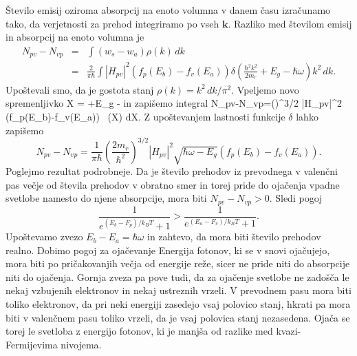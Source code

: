 Število emisij oziroma absorpcij na enoto volumna v danem času izračunamo tako,
da verjetnosti za prehod integriramo po vseh $\mathbf{k}$. Razliko med številom 
emisij in absorpcij na enoto volumna je
\begin{eqnarray}  
N_{pv}-N_{vp}&=&\int\left(w_s-w_a\right)\rho(k)\,dk  \nonumber \\
&=&\frac{2}{\pi\hbar} \int |H_{pv}|^2\left(f_p(E_b)-f_v(E_a)\right)
\delta \left(\frac{\hbar^2 k^2}{2m_r}+E_g -\hbar\omega\right) k^2\,dk.
\label{6.7}
\end{eqnarray}
Upoštevali smo, da je gostota stanj $\rho(k)=k^2\, dk/\pi^2$. Vpeljemo
novo spremenljivko 
\beq
X = +E_g -\hbar\omega
\eeq
in zapišemo integral
\beq
N_{pv}-N_{vp}=\left(\right)^{3/2} 
\int |H_{pv}|^2 \left(f_p(E_b)-f_v(E_a)\right)
\,
\delta (X) dX.
\label{6.7a}
\eeq
Z upoštevanjem lastnosti funkcije $\delta$ lahko zapišemo
\begin{equation}  
N_{pv}-N_{vp}=\frac{1}{\pi\hbar}\left(\frac{2m_r}{\hbar^2}\right)^{3/2}
|H_{pv}|^2 \sqrt{\hbar \omega-E_g}\left(f_p(E_b)-f_v(E_a)\right).
\label{6.11}
\end{equation}
Poglejmo rezultat podrobneje. Da je število prehodov iz prevodnega v valenčni pas
večje od števila prehodov v obratno smer in torej pride do ojačenja vpadne svetlobe 
namesto do njene absorpcije, mora biti $N_{pv}-N_{vp} >0$. Sledi pogoj
\begin{equation}  
\frac{1}{e^{(E_b-F_{p})/k_B T}+1}>\frac{1}{e^{(E_a-F_v)/k_B T}+1}.
\label{6.12}
\end{equation}
Upoštevamo zvezo $E_b-E_a = \hbar \omega$ in zahtevo, da mora biti število prehodov realno. 
Dobimo pogoj za ojačevanje 
Energija fotonov, ki se v snovi ojačujejo, mora biti po pričakovanjih večja od
energije reže, sicer ne pride niti do absorpcije niti do ojačenja. Gornja zveza pa pove tudi, 
da za ojačenje svetlobe ne zadošča le nekaj vzbujenih elektronov in nekaj ustreznih vrzeli. 
V prevodnem pasu mora biti toliko elektronov, da pri neki energiji zasedejo vsaj polovico stanj, 
hkrati pa mora biti v valenčnem pasu toliko vrzeli, da je vsaj polovica stanj nezasedena.
Ojača se torej le svetloba z energijo fotonov, ki je manjša od razlike med kvazi-Fermijevima
nivojema. 


